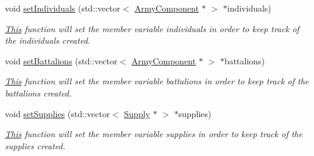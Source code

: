 \begin{DoxyCompactItemize}
void \mbox{\hyperlink{class_army_builder_aac7a2b1a5012fe2e9ff810636e53acf5}{set\+Individuals}} (std\+::vector$<$ \mbox{\hyperlink{class_army_component}{Army\+Component}} $\ast$ $>$ $\ast$individuals)
\begin{DoxyCompactList}\small\item\em \mbox{\hyperlink{class_this}{This}} function will set the member variable individuals in order to keep track of the individuals created. \end{DoxyCompactList}\item 
void \mbox{\hyperlink{class_army_builder_a42dc02e38cf9c9f1ec18026e20cabb69}{set\+Battalions}} (std\+::vector$<$ \mbox{\hyperlink{class_army_component}{Army\+Component}} $\ast$ $>$ $\ast$battalions)
\begin{DoxyCompactList}\small\item\em \mbox{\hyperlink{class_this}{This}} function will set the member variable battalions in order to keep track of the battalions created. \end{DoxyCompactList}\item 
void \mbox{\hyperlink{class_army_builder_ae8871d3c278ba62825e45fddcab90bb4}{set\+Supplies}} (std\+::vector$<$ \mbox{\hyperlink{class_supply}{Supply}} $\ast$ $>$ $\ast$supplies)
\begin{DoxyCompactList}\small\item\em \mbox{\hyperlink{class_this}{This}} function will set the member variable supplies in order to keep track of the supplies created. \end{DoxyCompactList}\end{DoxyCompactItemize}


